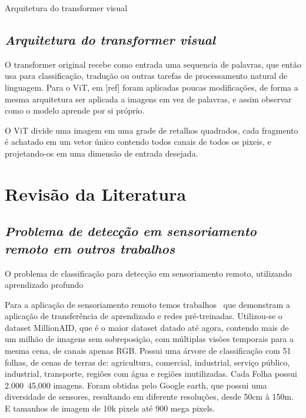 Arquitetura do transformer visual

\subsection{\textit{Arquitetura do transformer visual}}\label{sec:Cap2_transfer} 

O transformer original recebe como entrada uma sequencia de palavras, que então usa para classificação, tradução ou outras tarefas de processamento natural de linguagem. Para o ViT, em [ref] foram aplicadas poucas modificações, de forma a mesma arquitetura ser aplicada a imagens em vez de palavras, e assim observar como o modelo aprende por si próprio.

O ViT divide uma imagem em uma grade de retalhos quadrados, cada fragmento é achatado em um vetor único contendo todos canais de todos os pixeis, e projetando-os em uma dimensão de entrada desejada.

\section{Revisão da Literatura}\label{sec:Cap2_revisao_literatura}

\subsection{\textit{Problema de detecção em sensoriamento remoto em outros trabalhos}}\label{sec:Cap2_outros_trabalhos}


O problema de classificação para detecção em sensoriamento remoto, utilizando aprendizado profundo~\cite{s20236936}


Para a aplicação de sensoriamento remoto temos trabalhos~\cite{wang2022empirical} que demonstram a aplicação de transferência de aprendizado e redes pré-treinadas. Utilizou-se o dataset MillionAID, que é o maior dataset datado até agora, contendo mais de um milhão de imagens sem sobreposição, com múltiplas visões temporais para a mesma cena, de canais apenas RGB. Possui uma árvore de classificação com 51 folhas, de cenas de terras de: agricultura, comercial, industrial, serviço público, industrial, transporte, regiões com água e regiões inutilizadas. Cada Folha possui 2.000~45,000 imagens. Foram obtidas pelo Google earth, que possui uma diversidade de sensores, resultando em diferente resoluções, desde 50cm à 150m. E tamanhos de imagem de 10k pixels até 900 mega pixels.




